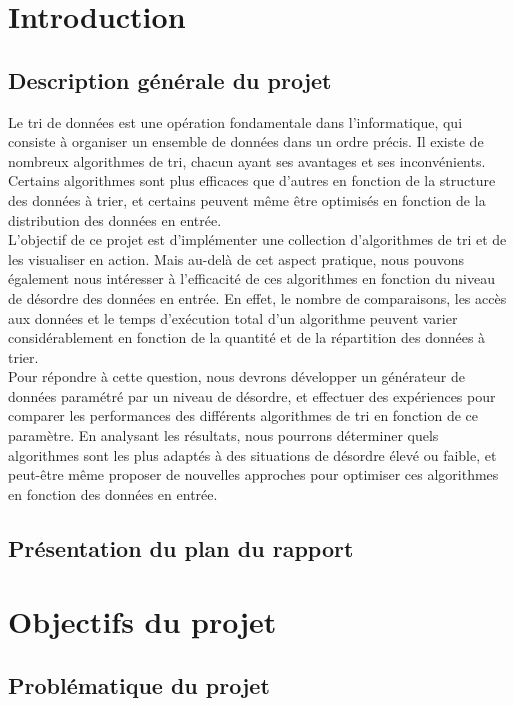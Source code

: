 \documentclass[10pt,a4paper]{article}
\begin{document}
\section{Introduction}

    \subsection{Description générale du projet}
     Le tri de données est une opération fondamentale dans l'informatique, qui consiste à organiser un ensemble de données dans un ordre précis. Il existe de nombreux algorithmes de tri, chacun ayant ses avantages et ses inconvénients. Certains algorithmes sont plus efficaces que d'autres en fonction de la structure des données à trier, et certains peuvent même être optimisés en fonction de la distribution des données en entrée.\\

    L'objectif de ce projet est d'implémenter une collection d'algorithmes de tri et de les visualiser en action. Mais au-delà de cet aspect pratique, nous pouvons également nous intéresser à l'efficacité de ces algorithmes en fonction du niveau de désordre des données en entrée. En effet, le nombre de comparaisons, les accès aux données et le temps d'exécution total d'un algorithme peuvent varier considérablement en fonction de la quantité et de la répartition des données à trier.\\
    
    Pour répondre à cette question, nous devrons développer un générateur de données paramétré par un niveau de désordre, et effectuer des expériences pour comparer les performances des différents algorithmes de tri en fonction de ce paramètre. En analysant les résultats, nous pourrons déterminer quels algorithmes sont les plus adaptés à des situations de désordre élevé ou faible, et peut-être même proposer de nouvelles approches pour optimiser ces algorithmes en fonction des données en entrée.
    
    
\newpage
\subsection{Présentation du plan du rapport}
\tableofcontents
\newpage

\section{Objectifs du projet}
    \subsection{Problématique du projet}
\end{document}
